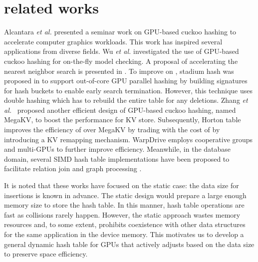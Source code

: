 \section{related works}\label{sec:rel}
Alcantara \textit{et al.} \cite{alcantara2009real} presented a seminar work on GPU-based cuckoo hashing to accelerate computer graphics workloads. 
This work has inspired several applications from diverse fields. Wu \textit{et al.} \cite{wu2015gpu} investigated the use of GPU-based cuckoo hashing for on-the-fly model checking. 
A proposal of accelerating the nearest neighbor search is presented in \cite{pan2010efficient}. 
To improve on \cite{alcantara2009real}, stadium hash was proposed in \cite{khorasani2015stadium} to support out-of-core GPU parallel hashing by building signatures for hash buckets to enable early search termination. However, this technique uses double hashing which has to rebuild the entire table for any deletions.  
Zhang \textit{et al.}~\cite{zhang2015mega} proposed another efficient design of GPU-based cuckoo hashing, named MegaKV, 
to boost the performance for KV store. 
Subsequently, Horton table \cite{breslow2016horton} improves the efficiency of  over MegaKV by trading with the cost of  by introducing a KV remapping mechanism.
WarpDrive \cite{junger2018warpdrive} employs cooperative groups and multi-GPUs to further improve efficiency.
Meanwhile, in the database domain, several SIMD hash table implementations have been proposed to facilitate relation join and graph processing \cite{ross2007efficient,zhong2014medusa}. 

It is noted that these works have focused on the static case: the data size for insertions is known in advance. The static design would prepare a large enough memory size to store the hash table. In this manner, hash table operations are fast as collisions rarely happen. However, the static approach wastes memory resources and, to some extent, prohibits coexistence with other data structures for the same application in the device memory. 
This motivates us to develop a general dynamic hash table for GPUs that actively adjusts based on the data size to preserve space efficiency. 

